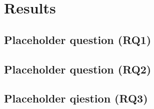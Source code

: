 \chapter{Results\label{results}}
\section{Placeholder question (RQ1)}
\section{Placeholder question (RQ2)}
\section{Placeholder qiestion (RQ3)}